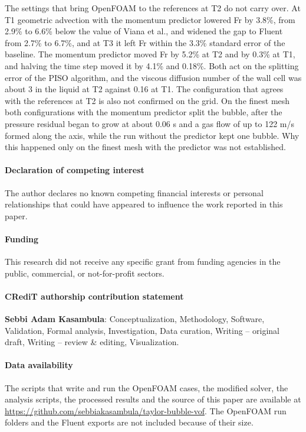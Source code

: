 \documentclass[11pt,a4paper]{article}
\begin{document}
The settings that bring OpenFOAM to the references at T2 do not carry over. At T1 geometric advection with the momentum predictor lowered Fr by 3.8\%, from 2.9\% to 6.6\% below the value of Viana et al., and widened the gap to Fluent from 2.7\% to 6.7\%, and at T3 it left Fr within the 3.3\% standard error of the baseline. The momentum predictor moved Fr by 5.2\% at T2 and by 0.3\% at T1, and halving the time step moved it by 4.1\% and 0.18\%. Both act on the splitting error of the PISO algorithm, and the viscous diffusion number of the wall cell was about 3 in the liquid at T2 against 0.16 at T1. The configuration that agrees with the references at T2 is also not confirmed on the grid. On the finest mesh both configurations with the momentum predictor split the bubble, after the pressure residual began to grow at about 0.06 s and a gas flow of up to 122 m/s formed along the axis, while the run without the predictor kept one bubble. Why this happened only on the finest mesh with the predictor was not established.

\clearpage
\paragraph*{Declaration of competing interest}
The author declares no known competing financial interests or personal relationships that could have appeared to influence the work reported in this paper.

\paragraph*{Funding}
This research did not receive any specific grant from funding agencies in the public, commercial, or not-for-profit sectors.

\paragraph*{CRediT authorship contribution statement}
\textbf{Sebbi Adam Kasambula}: Conceptualization, Methodology, Software, Validation, Formal analysis, Investigation, Data curation, Writing -- original draft, Writing -- review \& editing, Visualization.

\paragraph*{Data availability}
The scripts that write and run the OpenFOAM cases, the modified solver, the analysis scripts, the processed results and the source of this paper are available at \url{https://github.com/sebbiakasambula/taylor-bubble-vof}. The OpenFOAM run folders and the Fluent exports are not included because of their size.
\end{document}
